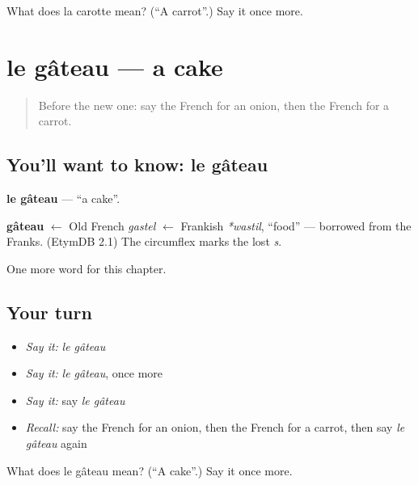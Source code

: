 \begin{tcolorbox}[breakable,colback=teal!4,colframe=teal!35!black,title={Before you move on}]
What does la carotte mean? (\textquotedblleft{}A carrot\textquotedblright{}.) Say it once more.
\end{tcolorbox}
\section[le gâteau]{le gâteau — a cake}

\label{lesson:FR-C69-gateau}



\begin{quote}
Before the new one: say the French for an onion, then the French for a carrot.
\end{quote}

\subsection*{You'll want to know: le gâteau}
\textbf{le gâteau} — \textquotedblleft{}a cake\textquotedblright{}.

\begin{cousinweb}
\textbf{gâteau} $\leftarrow$ Old French \emph{gastel} $\leftarrow$ Frankish \emph{*wastil}, \textquotedblleft{}food\textquotedblright{} — borrowed from the Franks. (EtymDB 2.1) The circumflex marks the lost \emph{s}.
\end{cousinweb}

\begin{grammarlens}[title={What you've built}]
One more word for this chapter.
\end{grammarlens}

\subsection*{Your turn}
\begin{itemize}
\raggedright
  \item \emph{Say it:} \emph{le gâteau}
  \item \emph{Say it:} \emph{le gâteau}, once more
  \item \emph{Say it:} say \emph{le gâteau}
  \item \emph{Recall:} say the French for an onion, then the French for a carrot, then say \emph{le gâteau} again
\end{itemize}

\begin{tcolorbox}[breakable,colback=teal!4,colframe=teal!35!black,title={Before you move on}]
What does le gâteau mean? (\textquotedblleft{}A cake\textquotedblright{}.) Say it once more.
\end{tcolorbox}
